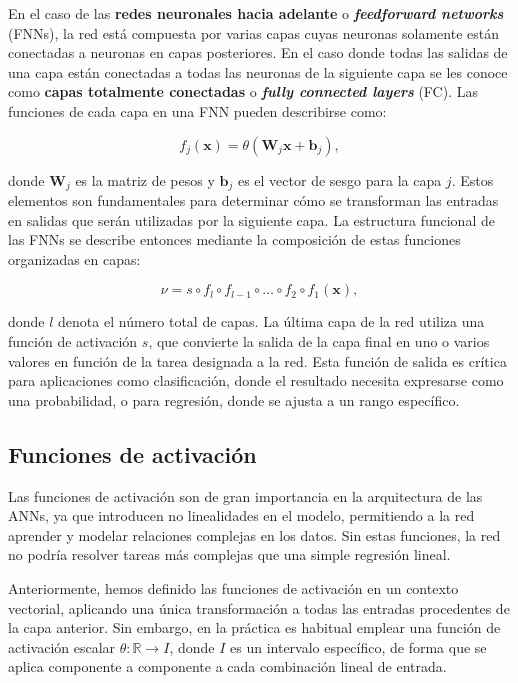 En el caso de las \textbf{redes neuronales hacia adelante} o \textbf{\textit{feedforward networks}} (FNNs), la red está compuesta por varias capas cuyas neuronas solamente están conectadas a neuronas en capas posteriores. En el caso donde todas las salidas de una capa están conectadas a todas las neuronas de la siguiente capa se les conoce como \textbf{capas totalmente conectadas} o \textbf{\textit{fully connected layers}} (FC). Las funciones de cada capa en una FNN pueden describirse como:

\[
f_j(\mathbf{x}) = \theta \left( \mathbf{W}_j \mathbf{x} + \mathbf{b}_j \right),
\]

donde \( \mathbf{W}_j \) es la matriz de pesos y \( \mathbf{b}_j \) es el vector de sesgo para la capa \( j \). Estos elementos son fundamentales para determinar cómo se transforman las entradas en salidas que serán utilizadas por la siguiente capa. La estructura funcional de las FNNs se describe entonces mediante la composición de estas funciones organizadas en capas:

\[
\nu = s \circ f_l \circ f_{l-1} \circ \ldots \circ f_2 \circ f_1(\mathbf{x}),
\]

donde \( l \) denota el número total de capas. La última capa de la red utiliza una función de activación \( s \), que convierte la salida de la capa final en uno o varios valores en función de la tarea designada a la red. Esta función de salida es crítica para aplicaciones como clasificación, donde el resultado necesita expresarse como una probabilidad, o para regresión, donde se ajusta a un rango específico.

\subsection{Funciones de activación}

Las funciones de activación son de gran importancia en la arquitectura de las ANNs, ya que introducen no linealidades en el modelo, permitiendo a la red aprender y modelar relaciones complejas en los datos. Sin estas funciones, la red no podría resolver tareas más complejas que una simple regresión lineal.

Anteriormente, hemos definido las funciones de activación en un contexto vectorial, aplicando una única transformación a todas las entradas procedentes de la capa anterior. Sin embargo, en la práctica es habitual emplear una función de activación escalar \(\theta : \mathbb{R} \rightarrow I\), donde \(I\) es un intervalo específico, de forma que se aplica componente a componente a cada combinación lineal de entrada.


